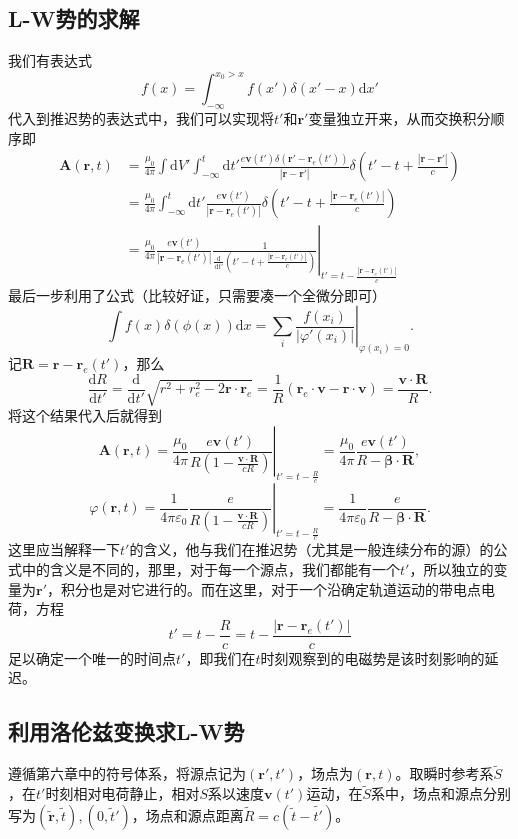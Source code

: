 \documentclass[UTF8]{ctexbook}
\renewcommand{\d}{\mathrm{d}}
\renewcommand{\b}{\boldsymbol}
\renewcommand{\k}{\frac{1}{4\pi\varepsilon_0}}
\numberwithin{equation}{chapter}
\begin{document}
	\subsection{L-W势的求解}
	我们有表达式
	\[f(x)=\int_{-\infty}^{x_0>x} f(x')\delta(x'-x)\d x'\]
	代入到推迟势的表达式中，我们可以实现将$t'$和$\b{r}'$变量独立开来，从而交换积分顺序即
	\begin{align*}
		\b{A}(\b{r},t)&=\frac{\mu_0}{4\pi}\int \d V' \int_{-\infty}^t \d t'\frac{ e\b{v}(t')\delta(\b{r}'-\b{r}_e(t'))}{|\b{r}-\b{r}'|}\delta\left(t'-t+\frac{|\b{r}-\b{r}'|}{c}\right) \\
		&=\frac{\mu_0}{4\pi}\int_{-\infty}^t \d t'\frac{ e\b{v}(t')}{|\b{r}-\b{r}_e(t')|}\delta\left(t'-t+\frac{|\b{r}-\b{r}_e(t')|}{c}\right) \\
		&=\frac{\mu_0}{4\pi}\frac{e\b{v}(t')}{|\b{r}-\b{r}_e(t')|}\left.\frac{1}{\frac{\d }{\d t'}\left(t'-t+\frac{|\b{r}-\b{r}_e(t')|}{c}\right)}\right|_{t'=t-\frac{|\b{r}-\b{r}_e(t')|}{c}}
	\end{align*}
	最后一步利用了公式（比较好证，只需要凑一个全微分即可）
	\[\int f(x)\delta(\phi(x)) \d x=\left.\sum_i \frac{ f(x_i)}{|\varphi'(x_i)|}\right|_{\varphi(x_i)=0}.\]
	记$\b{R}=\b{r}-\b{r}_e(t')$，那么
	\[\frac{\d R}{\d t'}=\frac{\d}{\d t'}\sqrt{r^2+r_e^2-2\b{r}\cdot\b{r}_e}=\frac{1}{R}(\b{r}_e\cdot\b{v}-\b{r}\cdot\b{v})=\frac{\b{v}\cdot\b{R}}{R}.\]
	将这个结果代入后就得到
	\[\b{A}(\b{r},t)=\frac{\mu_0}{4\pi}\left.\frac{e\b{v}(t')}{R\left(1-\frac{\b{v}\cdot\b{R}}{cR}\right)}\right|_{t'=t-\frac{R}{c}}=\frac{\mu_0}{4\pi}\frac{e\b{v}(t')}{R-\b{\beta}\cdot\b{R}},\]
	\[\varphi(\b{r},t)=\k \left.\frac{e}{R\left(1-\frac{\b{v}\cdot\b{R}}{cR}\right)}\right|_{t'=t-\frac{R}{c}}=\k\frac{e}{R-\b{\beta}\cdot\b{R}}.\]
	这里应当解释一下$t'$的含义，他与我们在推迟势（尤其是一般连续分布的源）的公式中的含义是不同的，那里，对于每一个源点，我们都能有一个$t'$，所以独立的变量为$\b{r}'$，积分也是对它进行的。而在这里，对于一个沿确定轨道运动的带电点电荷，方程
	\[t'=t-\frac{R}{c}=t-\frac{|\b{r}-\b{r}_e(t')|}{c}\]
	足以确定一个唯一的时间点$t'$，即我们在$t$时刻观察到的电磁势是该时刻影响的延迟。
	
	\subsection{利用洛伦兹变换求L-W势}
	遵循第六章中的符号体系，将源点记为$(\b{r}',t')$，场点为$(\b{r},t)$。取瞬时参考系$\tilde{S}$，在$t'$时刻相对电荷静止，相对$S$系以速度$\b{v}(t')$运动，在$\tilde{S}$系中，场点和源点分别写为$(\tilde{\b{r}},\tilde{t}),(0,\tilde{t}')$，场点和源点距离$\tilde{R}=c(\tilde{t}-\tilde{t'})$。
	
\end{document}
